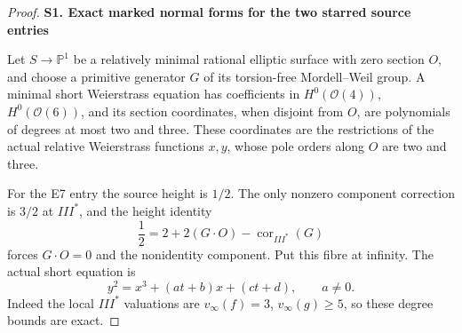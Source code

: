 \begin{proof}
\par

\medskip\noindent\textbf{S1. Exact marked normal forms for the two starred source entries}

\par\nobreak

Let \(S\to\mathbb P^1\) be a relatively minimal rational elliptic
surface with zero section \(O\), and choose a primitive generator
\(G\) of its torsion-free Mordell--Weil group. A minimal short
Weierstrass equation has coefficients in
\(H^0(\mathcal O(4))\), \(H^0(\mathcal O(6))\), and its section
coordinates, when disjoint from \(O\), are polynomials of degrees
at most two and three. These coordinates are the restrictions
of the actual relative Weierstrass functions \(x,y\), whose pole
orders along \(O\) are two and three.

For the E7 entry the source height is \(1/2\). The only nonzero
component correction is \(3/2\) at \(III^*\), and the height
identity
\[
 \frac12=2+2(G\cdot O)-\operatorname{cor}_{III^*}(G)
\]
forces \(G\cdot O=0\) and the nonidentity component. Put this
fibre at infinity. The actual short equation is
\[
                 y^2=x^3+(a t+b)x+(c t+d),\qquad a\ne0.
 \tag{S51.1}
\]
Indeed the local \(III^*\) valuations are
\(v_\infty(f)=3\), \(v_\infty(g)\ge5\), so these degree bounds
are exact.


\end{proof}
